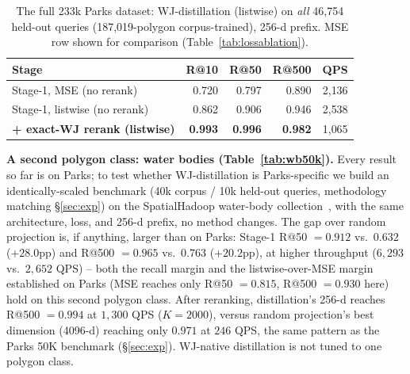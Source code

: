 \documentclass[sigconf]{acmart}
\begin{document}
\begin{table}[t]\centering
\caption{The full 233k Parks dataset: WJ-distillation (listwise) on \emph{all}
46{,}754 held-out queries (187,019-polygon corpus-trained), 256-d prefix. MSE row shown
for comparison (Table~\ref{tab:lossablation}).} %
\label{tab:full233}\setlength{\tabcolsep}{4pt}\small
\begin{tabular}{@{}lrrrr@{}}
\toprule
Stage & R@10 & R@50 & R@500 & QPS \\
\midrule
Stage-1, MSE (no rerank)        & 0.720 & 0.797 & 0.890 & 2{,}136 \\
Stage-1, listwise (no rerank)   & 0.862 & 0.906 & 0.946 & 2{,}538 \\
\textbf{+ exact-WJ rerank (listwise)} & \textbf{0.993} & \textbf{0.996} & \textbf{0.982} & 1{,}065 \\
\bottomrule
\end{tabular}
\end{table}

\textbf{A second polygon class: water bodies (Table~\ref{tab:wb50k}).} Every result
so far is on Parks; to test whether WJ-distillation is Parks-specific we build an
identically-scaled benchmark (40k corpus / 10k held-out queries, methodology
matching \S\ref{sec:exp}) on the SpatialHadoop water-body
collection~\cite{eldawy15}, with the same architecture, loss, and 256-d prefix,
no method changes. The gap over random projection is, if anything, larger than on
Parks: Stage-1 R@50 $=0.912$ vs.\ $0.632$ ($+28.0$pp) and R@500 $=0.965$ vs.\
$0.763$ ($+20.2$pp), at higher throughput ($6{,}293$ vs.\ $2{,}652$ QPS) --
both the recall margin and the listwise-over-MSE margin established on Parks
(MSE reaches only R@50 $=0.815$, R@500 $=0.930$ here) hold on this second polygon
class. After reranking, distillation's 256-d reaches R@500 $=0.994$ at $1{,}300$
QPS ($K{=}2000$), versus random projection's best dimension (4096-d) reaching only
$0.971$ at $246$ QPS, the same pattern as the Parks 50K benchmark
(\S\ref{sec:exp}). WJ-native distillation is not tuned to one polygon class.
\end{document}
